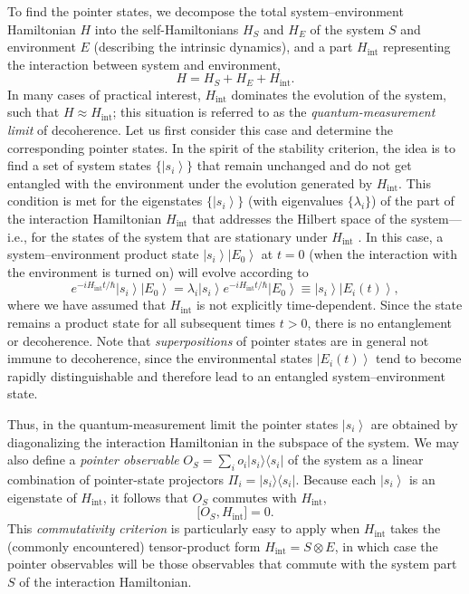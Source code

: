 \documentclass[3p,sort&compress]{elsarticle}
\newcommand{\ket}[1]{\left\vert{#1}\right\rangle}
\newcommand{\ketbra}[2]{\ensuremath{|{#1 \rangle}{\langle #2}|}}
\newcommand{\E}{\ensuremath{e}}
\newcommand{\I}{\ensuremath{i}}
\newcommand{\op}[1]{#1}
\begin{document}
To find the pointer states, we decompose the total system--environment Hamiltonian $\op{H}$ into the self-Hamiltonians $\op{H}_S$ and $\op{H}_E$ of the system $S$ and environment $E$ (describing the intrinsic dynamics), and a part $\op{H}_\text{int}$ representing the interaction between system and environment, 
%
\begin{equation}
H = \op{H}_S + \op{H}_E + \op{H}_\text{int}. 
\end{equation}
%
In many cases of practical interest, $\op{H}_\text{int}$ dominates the evolution of the system, such that $\op{H} \approx \op{H}_\text{int}$; this situation is referred to as the \emph{quantum-measurement limit} of decoherence. Let us first consider this case and determine the corresponding pointer states. In the spirit of the stability criterion, the idea is to find a set of system states $\{\ket{s_i}\}$ that remain unchanged and do not get entangled with the environment under the evolution generated by $\op{H}_\text{int}$. This condition is met for the eigenstates $\{\ket{s_i}\}$ (with eigenvalues $\{\lambda_i\}$) of the part of the interaction Hamiltonian $\op{H}_\text{int}$ that addresses the Hilbert space of the system---i.e., for the states of the system that are stationary under $\op{H}_\text{int}$ \cite{Zurek:1981:dd}. In this case, a system--environment product state $\ket{s_i}\ket{E_0}$ at $t=0$ (when the interaction with the environment is turned on) will evolve according to 
%
\begin{equation}
  \label{eq:gxlknn98ygya24}
  \E^{-\I \op{H}_\text{int} t/\hbar} \ket{s_i}\ket{E_0}=
  \lambda_i \ket{s_i}\E^{-\I \op{H}_\text{int} t/\hbar} \ket{E_0} \equiv  \ket{s_i}\ket{E_i(t)},
\end{equation}
%
where we have assumed that $\op{H}_\text{int}$ is not explicitly time-dependent. Since the state remains a product state for all subsequent times $t>0$, there is no entanglement or decoherence. Note that \emph{superpositions} of pointer states are in general not immune to decoherence, since the environmental states $\ket{E_i(t)}$ tend to become rapidly distinguishable and therefore lead to an entangled system--environment state. 

Thus, in the quantum-measurement limit the pointer states $\ket{s_i}$ are obtained by diagonalizing the interaction Hamiltonian in the subspace of the system. We may also define a \emph{pointer observable} $\op{O}_S = \sum_i o_i \ketbra{s_i}{s_i}$ of the system as a linear combination of pointer-state projectors $\op{\Pi}_i=\ketbra{s_i}{s_i}$.  Because each $\ket{s_i}$ is an eigenstate of $\op{H}_\text{int}$, it follows that $\op{O}_S$ commutes with $\op{H}_\text{int}$,
%
\begin{equation}
  \label{eq:dhvvsdnbbfvs27}
  \bigl[ \op{O}_S, \op{H}_\text{int} \bigr] = 0.
\end{equation}
%
This \emph{commutativity criterion} \cite{Zurek:1981:dd,Zurek:1982:tv} is particularly easy to apply when $\op{H}_\text{int}$ takes the (commonly encountered) tensor-product form $\op{H}_\text{int} = \op{S} \otimes \op{E}$, in which case the pointer observables will be those observables that commute with the system part $\op{S}$ of the interaction Hamiltonian. 
\end{document}
